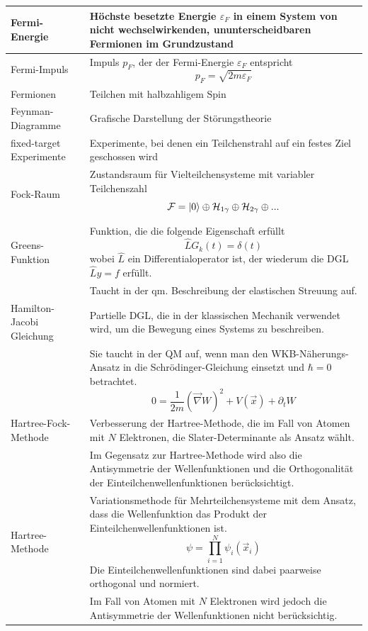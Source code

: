 \documentclass{article}
\begin{document}
\begin{xltabular}{\linewidth}{p{6cm}|X}
	\hline
		Fermi-Energie & Höchste besetzte Energie $\varepsilon_F$ in einem System von nicht wechselwirkenden, ununterscheidbaren Fermionen im Grundzustand \\
	\hline
		Fermi-Impuls & Impuls $p_F$, der der Fermi-Energie $\varepsilon_F$ entspricht
			$$p_F = \sqrt{2m \varepsilon_F}$$ \\
	\hline
		Fermionen & Teilchen mit halbzahligem Spin \\
	\hline
		Feynman-Diagramme & Grafische Darstellung der Störungstheorie \\
	\hline
		fixed-target Experimente & Experimente, bei denen ein Teilchenstrahl
auf ein festes Ziel geschossen wird \\
	\hline
		Fock-Raum & Zustandsraum für Vielteilchensysteme mit variabler Teilchenszahl {\color{gruen}$$\mathcal{F} = \ket{0} \oplus \mathcal{H}_{1\gamma} \oplus \mathcal{H}_{2\gamma} \oplus ...$$} \\
	\hline
		Greens-Funktion & Funktion, die die folgende Eigenschaft erfüllt
			$$\hat{L} G_k(t) = \delta(t)$$
		wobei $\hat{L}$ ein Differentialoperator ist, der wiederum die DGL $\hat{L} y = f$ erfüllt. \\
	& \textcolor{gruen}{Taucht in der qm. Beschreibung der elastischen Streuung auf.} \\
	\hline
		Hamilton-Jacobi Gleichung & Partielle DGL, die in der klassischen Mechanik verwendet wird, um die Bewegung eines Systems zu beschreiben.\\
		& Sie taucht in der QM auf, wenn man den WKB-Näherungs-Ansatz in die Schrödinger-Gleichung einsetzt und $\hbar=0$ betrachtet.
		$$0 = \frac{1}{2m}(\vec{\nabla}W)^2 + V(\vec{x}) + \partial_t W$$ \\
	\hline	
		Hartree-Fock-Methode & Verbesserung der Hartree-Methode, die im Fall von Atomen mit $N$ Elektronen, die Slater-Determinante als Ansatz wählt.\\
		& Im Gegensatz zur Hartree-Methode wird also die Antisymmetrie der Wellenfunktionen und die Orthogonalität der Einteilchenwellenfunktionen berücksichtigt. \\
	\hline
		Hartree-Methode & Variationsmethode für Mehrteilchensysteme mit dem Ansatz, dass die Wellenfunktion das Produkt der Einteilchenwellenfunktionen ist.
			$$\psi = \prod_{i=1}^N \psi_i(\vec{x}_i)$$
		Die Einteilchenwellenfunktionen sind dabei paarweise orthogonal und normiert.\\
		& Im Fall von Atomen mit $N$ Elektronen wird jedoch die Antisymmetrie der Wellenfunktionen nicht berücksichtig. \\

\end{xltabular}
\end{document}
